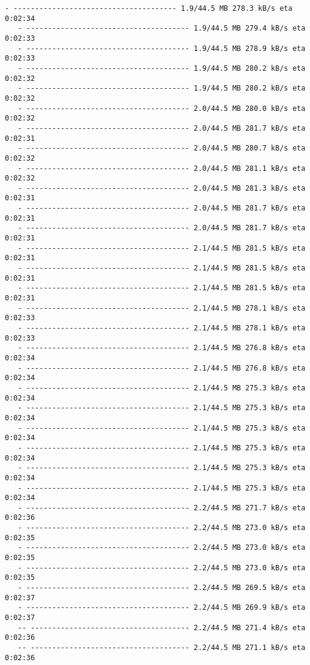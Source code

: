 \documentclass[11pt]{article}
\begin{document}
\begin{Verbatim}[commandchars=\\\{\}]
   - -------------------------------------- 1.9/44.5 MB 278.3 kB/s eta 0:02:34
   - -------------------------------------- 1.9/44.5 MB 279.4 kB/s eta 0:02:33
   - -------------------------------------- 1.9/44.5 MB 278.9 kB/s eta 0:02:33
   - -------------------------------------- 1.9/44.5 MB 280.2 kB/s eta 0:02:32
   - -------------------------------------- 1.9/44.5 MB 280.2 kB/s eta 0:02:32
   - -------------------------------------- 2.0/44.5 MB 280.0 kB/s eta 0:02:32
   - -------------------------------------- 2.0/44.5 MB 281.7 kB/s eta 0:02:31
   - -------------------------------------- 2.0/44.5 MB 280.7 kB/s eta 0:02:32
   - -------------------------------------- 2.0/44.5 MB 281.1 kB/s eta 0:02:32
   - -------------------------------------- 2.0/44.5 MB 281.3 kB/s eta 0:02:31
   - -------------------------------------- 2.0/44.5 MB 281.7 kB/s eta 0:02:31
   - -------------------------------------- 2.0/44.5 MB 281.7 kB/s eta 0:02:31
   - -------------------------------------- 2.1/44.5 MB 281.5 kB/s eta 0:02:31
   - -------------------------------------- 2.1/44.5 MB 281.5 kB/s eta 0:02:31
   - -------------------------------------- 2.1/44.5 MB 281.5 kB/s eta 0:02:31
   - -------------------------------------- 2.1/44.5 MB 278.1 kB/s eta 0:02:33
   - -------------------------------------- 2.1/44.5 MB 278.1 kB/s eta 0:02:33
   - -------------------------------------- 2.1/44.5 MB 276.8 kB/s eta 0:02:34
   - -------------------------------------- 2.1/44.5 MB 276.8 kB/s eta 0:02:34
   - -------------------------------------- 2.1/44.5 MB 275.3 kB/s eta 0:02:34
   - -------------------------------------- 2.1/44.5 MB 275.3 kB/s eta 0:02:34
   - -------------------------------------- 2.1/44.5 MB 275.3 kB/s eta 0:02:34
   - -------------------------------------- 2.1/44.5 MB 275.3 kB/s eta 0:02:34
   - -------------------------------------- 2.1/44.5 MB 275.3 kB/s eta 0:02:34
   - -------------------------------------- 2.1/44.5 MB 275.3 kB/s eta 0:02:34
   - -------------------------------------- 2.2/44.5 MB 271.7 kB/s eta 0:02:36
   - -------------------------------------- 2.2/44.5 MB 273.0 kB/s eta 0:02:35
   - -------------------------------------- 2.2/44.5 MB 273.0 kB/s eta 0:02:35
   - -------------------------------------- 2.2/44.5 MB 273.0 kB/s eta 0:02:35
   - -------------------------------------- 2.2/44.5 MB 269.5 kB/s eta 0:02:37
   - -------------------------------------- 2.2/44.5 MB 269.9 kB/s eta 0:02:37
   -- ------------------------------------- 2.2/44.5 MB 271.4 kB/s eta 0:02:36
   -- ------------------------------------- 2.2/44.5 MB 271.1 kB/s eta 0:02:36

\end{Verbatim}
\end{document}
